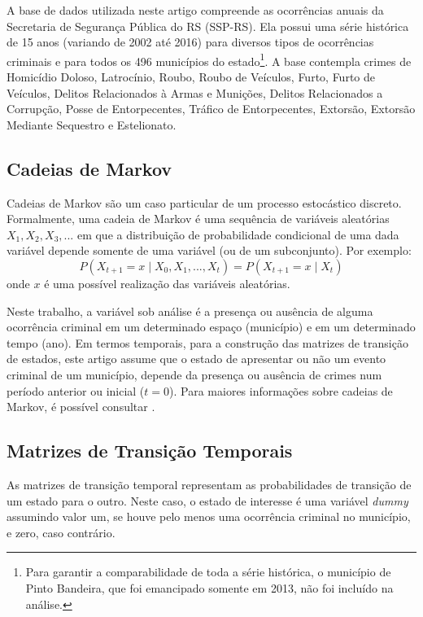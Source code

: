 \documentclass[12pt,openright,oneside,a4paper,english,french,spanish]{abntex2}
\numberwithin{table}{section} %
\numberwithin{figure}{section} %
\newcommand{\co}{\citeonline}
\begin{document}
A base de dados utilizada neste artigo compreende as ocorrências anuais da Secretaria de Segurança Pública do RS (SSP-RS). Ela possui uma série histórica de 15 anos (variando de 2002 até 2016) para diversos tipos de ocorrências criminais e para todos os 496 municípios do estado\footnote{Para garantir a comparabilidade de toda a série histórica, o município de Pinto Bandeira, que foi emancipado somente em 2013, não foi incluído na análise.}. A base contempla crimes de Homicídio Doloso, Latrocínio, Roubo, Roubo de Veículos, Furto, Furto de Veículos, Delitos Relacionados à Armas e Munições, Delitos Relacionados a Corrupção, Posse de Entorpecentes, Tráfico de Entorpecentes, Extorsão, Extorsão Mediante Sequestro e Estelionato.

\subsection{Cadeias de Markov\label{sec:cadeias_acoplamento}}

Cadeias de Markov são um caso particular de um processo estocástico discreto. Formalmente, uma cadeia de Markov é uma sequência de variáveis aleatórias $X_1,X_2,X_3,...$ em que a distribuição de probabilidade condicional de uma dada variável depende somente de uma variável (ou de um subconjunto). Por exemplo:
\begin{equation}
P(X_{t+1} = x \mid X_0,X_1,...,X_t) = P(X_{t+1} = x \mid X_t)
\label{eq:prob_cond_generica}
\end{equation}
onde $x$ é uma possível realização das variáveis aleatórias.

Neste trabalho, a variável sob análise é a presença ou ausência de alguma ocorrência criminal em um determinado espaço (município) e em um determinado tempo (ano). Em termos temporais, para a construção das matrizes de transição de estados, este artigo assume que o estado de apresentar ou não um evento criminal de um município, depende da presença ou ausência de crimes num período anterior ou inicial ($t=0$). Para maiores informações sobre cadeias de Markov, é possível consultar \co{norris1998markov}.

\subsection{Matrizes de Transição Temporais\label{sec:temporais_acoplamento}}


As matrizes de transição temporal representam as probabilidades de transição de um estado para o outro. Neste caso, o estado de interesse é uma variável \textit{dummy} assumindo valor um, se houve pelo menos uma ocorrência criminal no município, e zero, caso contrário.
\end{document}
